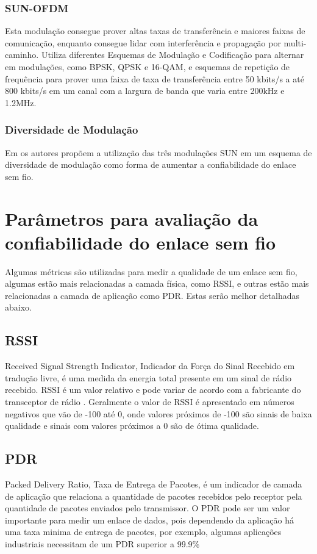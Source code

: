 \subsubsection*{SUN-OFDM}
Esta modulação consegue prover altas taxas de transferência e maiores faixas de comunicação, enquanto consegue lidar com interferência e propagação por multi-caminho. Utiliza diferentes Esquemas de Modulação e Codificação para alternar em modulações, como BPSK, QPSK e 16-QAM, e esquemas de repetição de frequência para prover uma faixa de taxa de transferência entre 50 kbits/s a até 800 kbits/s em um canal com a largura de banda que varia entre 200kHz e 1.2MHz.

\subsubsection*{Diversidade de Modulação}
Em \cite{gomes2020improving} os autores propõem a utilização das três modulações SUN em um esquema de diversidade de modulação como forma de aumentar a confiabilidade do enlace sem fio.

\section{Parâmetros para avaliação da confiabilidade do enlace sem fio}
\label{paramSF}
Algumas métricas são utilizadas para medir a qualidade de um enlace sem fio, algumas estão mais relacionadas a camada física, como RSSI, e outras estão mais relacionadas a camada de aplicação como PDR. Estas serão melhor detalhadas abaixo.
\subsection*{RSSI}
Received Signal Strength Indicator, Indicador da Força do Sinal Recebido em tradução livre, é uma medida da energia total presente em um sinal de rádio recebido. RSSI é um valor relativo e pode variar de acordo com a fabricante do transceptor de rádio \cite{UNDERSTANDING_RSSI}. Geralmente o valor de RSSI é apresentado em números negativos que vão de -100 até 0, onde valores próximos de -100 são sinais de baixa qualidade e sinais com valores próximos a 0 são de ótima qualidade.

\subsection*{PDR}
Packed Delivery Ratio, Taxa de Entrega de Pacotes, é um indicador de camada de aplicação que relaciona a quantidade de pacotes recebidos pelo receptor pela quantidade de pacotes enviados pelo transmissor. O PDR pode ser um valor importante para medir um enlace de dados, pois dependendo da aplicação há uma taxa minima de entrega de pacotes, por exemplo, algumas aplicações industriais necessitam de um PDR superior a 99.9\%

